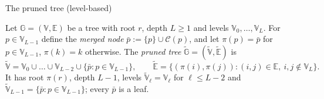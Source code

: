 \documentclass[aspectratio=169,11pt]{beamer}
\begin{document}
\begin{frame}{The pruned tree (level-based)}
\footnotesize
\begin{definition}
\upshape
Let $\mathbb{G}=(\mathbb{V},\mathbb{E})$ be a tree with root $r$, depth $L\ge1$ and levels
$\mathbb{V}_0,\dots,\mathbb{V}_L$. For $p\in\mathbb{V}_{L-1}$ define the \emph{merged node}
$\bar{p}:=\{p\}\cup\mathcal{C}(p)$, and let $\pi(p)=\bar{p}$ for $p\in\mathbb{V}_{L-1}$, $\pi(k)=k$ otherwise.
The \emph{pruned tree} $\tilde{\mathbb{G}}=(\tilde{\mathbb{V}},\tilde{\mathbb{E}})$ is
\[
\tilde{\mathbb{V}}=\mathbb{V}_0\cup\dots\cup\mathbb{V}_{L-2}\cup\{\bar{p}:p\in\mathbb{V}_{L-1}\},\qquad
\tilde{\mathbb{E}}=\{(\pi(i),\pi(j)) : (i,j)\in\mathbb{E},\ i,j\notin\mathbb{V}_L\}.
\]
It has root $\pi(r)$, depth $L-1$, levels $\tilde{\mathbb{V}}_\ell=\mathbb{V}_\ell$ for $\ell\le L-2$ and
$\tilde{\mathbb{V}}_{L-1}=\{\bar{p}:p\in\mathbb{V}_{L-1}\}$; every $\bar{p}$ is a leaf.
\end{definition}


\end{frame}
\end{document}
